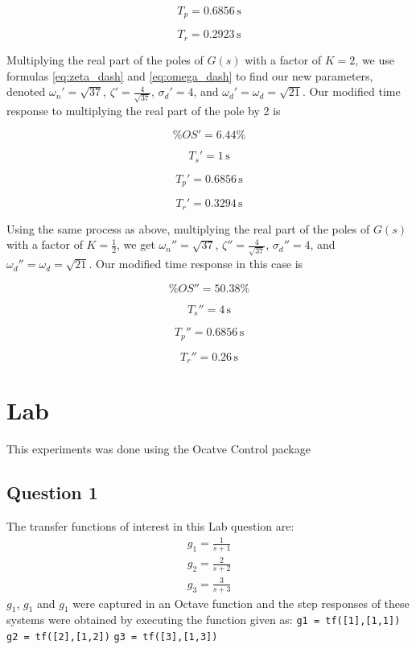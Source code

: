 \documentclass[a4paper, 12pt]{article}
\begin{document}
			\[
				T_p = 0.6856\,\text{s}
			\]

			\[
				T_r = 0.2923\,\text{s}
			\]

			Multiplying the real part of the poles of $G(s)$ with a factor of $K=2$, we use formulas \eqref{eq:zeta_dash} and \eqref{eq:omega_dash} to find our new parameters, denoted $\omega_n' = \sqrt{37}$, $\zeta' = \frac{4}{\sqrt{37}}$, $\sigma_d' = 4$, and $\omega_d' = \omega_d = \sqrt{21}$. Our modified time response to multiplying the real part of the pole by 2 is

			\[
				\%OS' = 6.44\%
			\]

			\[
				T_s' = 1\,\text{s}
			\]

			\[
				T_p' = 0.6856\,\text{s}
			\]

			\[
				T_r' = 0.3294\,\text{s}
			\]

			Using the same process as above, multiplying the real part of the poles of $G(s)$ with a factor of $K=\frac{1}{2}$, we get $\omega_n'' = \sqrt{37}$, $\zeta'' = \frac{4}{\sqrt{37}}$, $\sigma_d'' = 4$, and $\omega_d'' = \omega_d = \sqrt{21}$. Our modified time response in this case is

			\[
				\%OS'' = 50.38\%
			\]

			\[
				T_s'' = 4\,\text{s}
			\]

			\[
				T_p'' = 0.6856\,\text{s}
			\]

			\[
				T_r'' = 0.26\,\text{s}
			\]


	\section{Lab} %
	\label{sec:lab}
		This experiments was done using the Ocatve Control package
	\subsection{Question 1}
	\label{sec:question_1_lab}
		The transfer functions of interest in this Lab question are:
			\begin{equation}
				\begin{array}{rcl}
					g_1 = \frac{1}{s+1}\\
					g_2 = \frac{2}{s+2}\\
					g_3 = \frac{3}{s+3}
				\end{array}
			\end{equation}
		$g_1$, $g_1$ and $g_1$ were captured in an Octave function and the step responses of these systems were obtained by executing the function given as:
		\texttt{g1 = tf([1],[1,1])}
		\texttt{g2 = tf([2],[1,2])}
		\texttt{g3 = tf([3],[1,3])}
\end{document}
